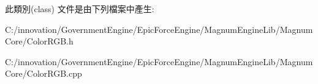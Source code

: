 此類別(class) 文件是由下列檔案中產生\+:\begin{DoxyCompactItemize}
\item 
C\+:/innovation/\+Government\+Engine/\+Epic\+Force\+Engine/\+Magnum\+Engine\+Lib/\+Magnum\+Core/Color\+R\+G\+B.\+h\item 
C\+:/innovation/\+Government\+Engine/\+Epic\+Force\+Engine/\+Magnum\+Engine\+Lib/\+Magnum\+Core/Color\+R\+G\+B.\+cpp\end{DoxyCompactItemize}

